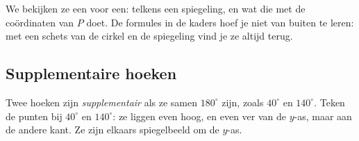
We bekijken ze een voor een: telkens een spiegeling, en wat die met de coördinaten van $P$ doet. De formules in de kaders hoef je niet van buiten te leren: met een schets van de cirkel en de spiegeling vind je ze altijd terug.

\subsection{Supplementaire hoeken}

Twee hoeken zijn \emph{supplementair} als ze samen $180^\circ$ zijn, zoals $40^\circ$ en $140^\circ$. Teken de punten bij $40^\circ$ en $140^\circ$: ze liggen even hoog, en even ver van de $y$-as, maar aan de andere kant. Ze zijn elkaars spiegelbeeld om de $y$-as.


